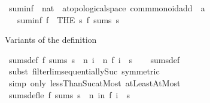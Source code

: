 \begin{isabellebody}
\isanewline
{}\isamarkupfalse%
\ suminf\ {\isacharcolon}{\kern0pt}{\isacharcolon}{\kern0pt}\ {\isachardoublequoteopen}{\isacharparenleft}{\kern0pt}nat\ {\isasymRightarrow}\ {\isacharprime}{\kern0pt}a{\isacharcolon}{\kern0pt}{\isacharcolon}{\kern0pt}{\isacharbraceleft}{\kern0pt}topological{\isacharunderscore}{\kern0pt}space{\isacharcomma}{\kern0pt}\ comm{\isacharunderscore}{\kern0pt}monoid{\isacharunderscore}{\kern0pt}add{\isacharbraceright}{\kern0pt}{\isacharparenright}{\kern0pt}\ {\isasymRightarrow}\ {\isacharprime}{\kern0pt}a{\isachardoublequoteclose}\isanewline
\ \ \ \ {\isacharparenleft}{\kern0pt}\ {\isachardoublequoteopen}{\isasymSum}{\isachardoublequoteclose}\ {}{}{\isacharparenright}{\kern0pt}\isanewline
\ \ \ {\isachardoublequoteopen}suminf\ f\ {\isacharequal}{\kern0pt}\ {\isacharparenleft}{\kern0pt}THE\ s{\isachardot}{\kern0pt}\ f\ sums\ s{\isacharparenright}{\kern0pt}{\isachardoublequoteclose}%
\begin{isamarkuptext}%
Variants of the definition%
\end{isamarkuptext}\isamarkuptrue%
\isamarkupfalse%
\ sums{\isacharunderscore}{\kern0pt}def{\isacharprime}{\kern0pt}{\isacharcolon}{\kern0pt}\ {\isachardoublequoteopen}f\ sums\ s\ {\isasymlongleftrightarrow}\ {\isacharparenleft}{\kern0pt}{\isasymlambda}n{\isachardot}{\kern0pt}\ {\isasymSum}i\ {\isacharequal}{\kern0pt}\ {}{\isachardot}{\kern0pt}{\isachardot}{\kern0pt}n{\isachardot}{\kern0pt}\ f\ i{\isacharparenright}{\kern0pt}\ {\isasymlonglonglongrightarrow}\ s{\isachardoublequoteclose}\isanewline
%
\isadelimproof
\ \ %
\endisadelimproof
%
\isatagproof
{}\isamarkupfalse%
\ sums{\isacharunderscore}{\kern0pt}def\isanewline
\ \ \isamarkupfalse%
\ {\isacharparenleft}{\kern0pt}subst\ filterlim{\isacharunderscore}{\kern0pt}sequentially{\isacharunderscore}{\kern0pt}Suc\ {\isacharbrackleft}{\kern0pt}symmetric{\isacharbrackright}{\kern0pt}{\isacharparenright}{\kern0pt}\isanewline
\ \ \isamarkupfalse%
\ {\isacharparenleft}{\kern0pt}simp\ only{\isacharcolon}{\kern0pt}\ lessThan{\isacharunderscore}{\kern0pt}Suc{\isacharunderscore}{\kern0pt}atMost\ atLeast{}AtMost{\isacharparenright}{\kern0pt}\isanewline
\ \ \isamarkupfalse%
%
\endisatagproof
{\isafoldproof}%
%
\isadelimproof
\isanewline
%
\endisadelimproof
\isanewline
{}\isamarkupfalse%
\ sums{\isacharunderscore}{\kern0pt}def{\isacharunderscore}{\kern0pt}le{\isacharcolon}{\kern0pt}\ {\isachardoublequoteopen}f\ sums\ s\ {\isasymlongleftrightarrow}\ {\isacharparenleft}{\kern0pt}{\isasymlambda}n{\isachardot}{\kern0pt}\ {\isasymSum}i{\isasymle}n{\isachardot}{\kern0pt}\ f\ i{\isacharparenright}{\kern0pt}\ {\isasymlonglonglongrightarrow}\ s{\isachardoublequoteclose}\isanewline

\end{isabellebody}
